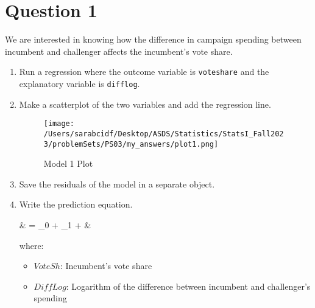 \documentclass[12pt,letterpaper]{article}
\begin{document}
\section*{Question 1}
\vspace{.25cm}
\noindent We are interested in knowing how the difference in campaign spending between incumbent and challenger affects the incumbent's vote share. 
	\begin{enumerate}
		\item Run a regression where the outcome variable is \texttt{voteshare} and the explanatory variable is \texttt{difflog}.	\vspace{0.5cm}
		
		 \vspace{5cm}
		
		\item Make a scatterplot of the two variables and add the regression line. 	\vspace{0.5cm}
		
		
		
		\begin{figure}[H]
			\centering
			\texttt{[image: /Users/sarabcidf/Desktop/ASDS/Statistics/StatsI\_Fall2023/problemSets/PS03/my\_answers/plot1.png]}
			\caption{Model 1 Plot}
		\end{figure}
		
		\item Save the residuals of the model in a separate object.	\vspace{0.5cm}
		
		
		
		\item Write the prediction equation.
		
		{\setlength{\abovedisplayskip}{2pt} 
			\setlength{\belowdisplayskip}{6pt} 
		
		\begin{flalign*}
			& = \beta_0 + \beta_1 \cdot {} + \varepsilon &
		\end{flalign*}
		
			where: 
		
		\begin{itemize}
			\item $VoteSh$: Incumbent's vote share
			\item $DiffLog$: Logarithm of the difference between incumbent and challenger's spending
		\end{itemize}
	   }
		
 		\end{enumerate}
	
\end{document}
